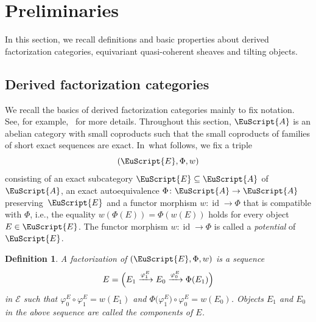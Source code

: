 \documentclass[10pt,a4paper]{amsart}
\newtheorem{dfn}{Definition}[section]
\numberwithin{equation}{section}
\newcommand{\id}{\operatorname{id}}
\newcommand{\scrA}{\EuScript{A}}
\newcommand{\scrE}{\EuScript{E}}
\begin{document}
\section{Preliminaries}%
In this section, we recall definitions and basic properties about derived factorization categories, equivariant quasi-coherent sheaves and tilting objects.

\subsection{Derived factorization categories}%
We recall the basics of derived factorization categories mainly to fix notation. See, for example,~\cite{bdfik,H1,posi} for more details.
Throughout this section, $\scrA$ is an abelian category with small coproducts such that the small coproducts of families of short exact sequences are exact. In~what follows, we fix a triple
\begin{equation}\label{triple}
(\scrE,\Phi,w)
\end{equation}
consisting of an exact subcategory $\scrE\subseteq\scrA$ of $\scrA$, an exact autoequivalence $\Phi\colon \scrA\to \scrA$ pre\-ser\-ving~$\scrE$ and a functor morphism $w\colon \id\to\Phi$ that is compatible with $\Phi$, i.e., the equality $w({\Phi(E)})=\Phi(w(E))$ holds for every object $E\in\scrE$. The functor morphism $w\colon \id\to\Phi$ is called a {\it potential} of $\scrE$.

\begin{dfn} A {\it factorization} of $(\scrE,\Phi,w)$ is a sequence
\begin{gather*}
E=\Bigl(E_1\xrightarrow{\varphi^E_1}E_0\xrightarrow{\varphi^E_0}\Phi(E_1)\Bigr)
\end{gather*}
in $\mathcal{E}$ such that $\varphi^E_0\circ\varphi^E_1=w(E_1)$ and $\Phi\big(\varphi^E_1\big)\circ\varphi^E_0=w(E_0)$. Objects $E_1$ and $E_0$ in the above sequence are called the {\it components} of $E$. \end{dfn}
\end{document}

